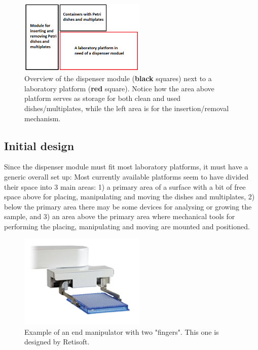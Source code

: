 \documentclass[10pt,a4paper]{article}
\begin{document}
	\begin{figure}
		\includegraphics[width=6cm]{images/platformOverview.png}
		\caption{Overview of the dispenser module ({\color{black}\textbf{black}} squares) next to a laboratory platform ({\color{red}\textbf{red}} square). Notice how the area above platform serves as storage for both clean and used dishes/multiplates, while the left area is for the insertion/removal mechanism.}
		\label{fig::platformOverview}
	\end{figure}
		
	\subsection{Initial design}\label{subsec:intialDesign}
		
	Since the dispenser module must fit most laboratory platforms, it must have a generic overall set up: Most currently available platforms seem to have divided their space into 3 main areas: 1) a primary area of a surface with a bit of free space above for placing, manipulating and moving the dishes and multiplates, 2) below the primary area there may be some devices for analysing or growing the sample, and 3) an area above the primary area where mechanical tools for performing the placing, manipulating and moving are mounted and positioned.
	
	\begin{figure}
		\includegraphics[width=6cm]{images/retisoftManipulator.png}
		\caption{Example of an end manipulator with two "fingers". This one is designed by Retisoft\cite{retisoftFlex_webpage}.}
		\label{fig::retisoftManipulator}
	\end{figure}
	
\end{document}
